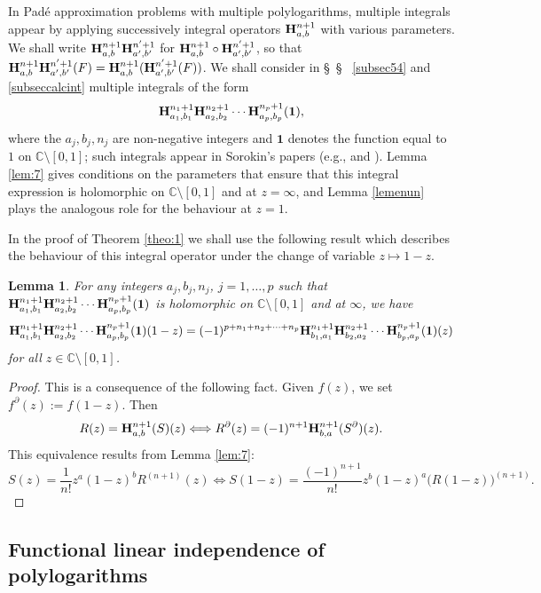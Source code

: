\documentclass[reqno,12pt]{amsart}
\numberwithin{equation}{section}
\newtheorem{lem}{Lemma}
\theoremstyle{remark}
\newcommand{\C}{\mathbb{C}}
\newcommand{\BBB}{{\bf H}}
\begin{document}
In Pad\'e approximation problems with multiple polylogarithms, multiple integrals appear by 
applying successively integral operators $\BBB_{a,b}^{n+1}$ with various parameters. We shall  write 
$\BBB^{n+1}_{a,b} \BBB^{n'+1}_{a',b'} $ for  $\BBB^{n+1}_{a,b}  \circ \BBB^{n'+1}_{a',b'} $, so that
$\BBB^{n+1}_{a,b} \BBB^{n'+1}_{a',b'} (F) = \BBB^{n+1}_{a,b} ( \BBB^{n'+1}_{a',b'} (F) )$. We shall consider 
in \S~\S~ \ref{subsec54} and \ref{subseccalcint} multiple integrals  of the form 
$$
\BBB^{n_1+1}_{a_1,b_1} \BBB^{n_2+1}_{a_2,b_2} \cdots \BBB^{n_p+1}_{a_p,b_p} (\boldsymbol{1}),
$$
where the $a_j, b_j, n_j$ are non-negative integers and $\boldsymbol{1}$ denotes the function equal to 
$1$ on $\C\setminus[0,1]$; such integrals appear in Sorokin's papers (e.g.,  \cite{sorokin2} and \cite{sorokin1}). 
Lemma \ref{lem:7} gives conditions on the parameters that ensure that this 
integral expression is holomorphic on $\C\setminus[0,1]$ and at $z=\infty$, and Lemma \ref{lemenun} 
plays the analogous role for the behaviour at $z=1$.

\bigskip

In the proof of Theorem \ref{theo:1} we shall use the following result which describes the behaviour of 
this integral operator under the change of variable $z\mapsto 1-z$.


\begin{lem}\label{lem:8} For any integers $a_j, b_j, n_j$, $j=1, \ldots, p$ such that 
$\BBB^{n_1+1}_{a_1,b_1} \BBB^{n_2+1}_{a_2,b_2} \cdots \BBB^{n_p+1}_{a_p,b_p}(\boldsymbol{1})$ is 
holomorphic on $\mathbb{C}\setminus [0,1]$ and at $\infty$, we have 
$$
\BBB^{n_1+1}_{a_1,b_1} \BBB^{n_2+1}_{a_2,b_2} \cdots \BBB^{n_p+1}_{a_p,b_p}(\boldsymbol{1})(1-z) = (-1)^{p+n_1+n_2+\cdots+n_p }
\BBB^{n_1+1}_{b_1,a_1} \BBB^{n_2+1}_{b_2,a_2} \cdots \BBB^{n_p+1}_{b_p,a_p}(\boldsymbol{1})(z)
$$
for all $z\in \mathbb{C}\setminus [0,1]$.
\end{lem}
\begin{proof} This is a  consequence of the following fact. Given $f(z)$, we set $f^{\partial}(z):=f(1-z)$. Then 
$$
R(z)=\BBB^{n+1}_{a,b} (S)(z) \Longleftrightarrow R^{\partial}(z)=(-1)^{n+1}\BBB^{n+1}_{b,a} (S^{\partial})(z).
$$
This equivalence results from  Lemma \ref{lem:7}:
$$
S(z)=\frac{1}{n!}z^{a}(1-z)^{b}  R^{(n+1)} (z) 
\Longleftrightarrow
S(1-z)=\frac{(-1)^{n+1}}{n!}z^{b}(1-z)^{a}\big(  R(1-z)\big)^{(n+1)}.
$$
\end{proof}



\subsection{Functional linear independence of polylogarithms}
\end{document}
